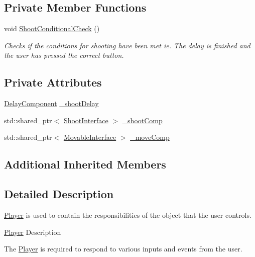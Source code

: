 \subsection*{Private Member Functions}
\begin{DoxyCompactItemize}
\item 
\mbox{\label{class_player_a54bee4abe93eea15c48fdbd85e4fdbd5}} 
void \hyperlink{class_player_a54bee4abe93eea15c48fdbd85e4fdbd5}{Shoot\+Conditional\+Check} ()
\begin{DoxyCompactList}\small\item\em Checks if the conditions for shooting have been met ie. The delay is finished and the user has pressed the correct button. \end{DoxyCompactList}\end{DoxyCompactItemize}
\subsection*{Private Attributes}
\begin{DoxyCompactItemize}
\item 
\hyperlink{class_delay_component}{Delay\+Component} \hyperlink{class_player_a6d672baf3630a81a32a8b9565129f559}{\+\_\+shoot\+Delay}
\item 
std\+::shared\+\_\+ptr$<$ \hyperlink{class_shoot_interface}{Shoot\+Interface} $>$ \hyperlink{class_player_af8bc99499c9a085235de04e04e4b7689}{\+\_\+shoot\+Comp}
\item 
std\+::shared\+\_\+ptr$<$ \hyperlink{class_movable_interface}{Movable\+Interface} $>$ \hyperlink{class_player_a6823a96878a4eadeb1ee6e6a31381ccd}{\+\_\+move\+Comp}
\end{DoxyCompactItemize}
\subsection*{Additional Inherited Members}


\subsection{Detailed Description}
\hyperlink{class_player}{Player} is used to contain the responsibilities of the object that the user controls. 

\hyperlink{class_player}{Player} Description

The \hyperlink{class_player}{Player} is required to respond to various inputs and events from the user. 

